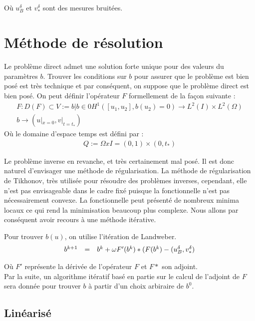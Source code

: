 \documentclass[a4paper,10pt]{article}
\begin{document}
Où $u^{\delta}_{B}$ et $v^{\delta}_{*}$ sont des mesures bruitées.


\section{Méthode de résolution}
Le problème direct admet une solution forte unique pour des valeurs du paramètres $b$. Trouver les conditions sur $b$ pour assurer que le problème est bien posé est très technique et par conséquent, on suppose que le problème direct est bien posé. On peut définir l'opérateur $F$ formellement de la façon suivante :
\[
\begin{array}{c}
F:D(F) \subset V:={b|b\in0 H^1([u_1,u_2], b(u_2)=0)} \rightarrow L^2(I) \times L^2(\Omega) \\
b \rightarrow (u|_{x=0}, v|_{t=t_*})
\end{array}
\]
Où le domaine d'espace temps est défini par :
\[
\begin{array}{c}
Q := \Omega x I = (0,1) \times (0, t_*)
\end{array}
\]

Le problème inverse en revanche, et très certainement mal posé. Il est donc naturel d'envisager une méthode de régularisation. La méthode de régularisation de Tikhonov, très utilisée pour résoudre des problèmes inverses, cependant, elle n'est pas envisageable dans le cadre fixé puisque la fonctionnelle n'est pas nécessairement convexe. La fonctionnelle peut présenté de nombreux minima locaux ce qui rend la minimisation beaucoup plus complexe. Nous allons par conséquent avoir recours à une méthode itérative.

Pour trouver $b(u)$, on utilise l'itération de Landweber.
\[
\begin{array}{r l c}
b^{k+1} 	&=&	b^{k} +  \omega F'(b^k)*(F(b^k) - (u^{\delta}_{B}, v^{\delta}_{*}) \\
\end{array}
\]

Où $F'$ représente la dérivée de l'opérateur $F$ et $F*$ son adjoint.\\

Par la suite, un algorithme itératif basé en partie sur le calcul de l'adjoint de $F$ sera donnée pour trouver $b$ à partir d'un choix arbiraire de $b^0$.

\subsection{Linéarisé}
\end{document}
